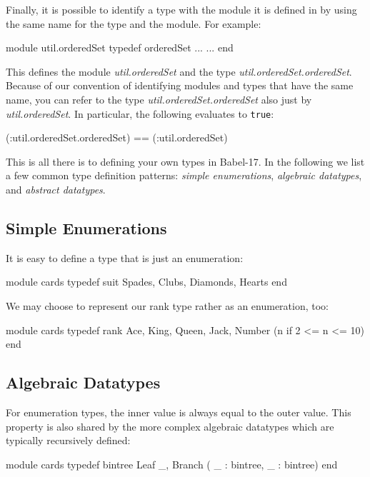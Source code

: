 \documentclass[11pt]{amsart}
\newcommand{\babelsrc}[1] {\lstinline!#1!}
\begin{document}
Finally, it is possible to identify a type with the module it is defined in by using the same name for the type and the module. For example:
\begin{babellisting}
module util.orderedSet
  typedef orderedSet ...
...
end
\end{babellisting}
This defines the module \emph{util.orderedSet} and the type \emph{util.orderedSet.orderedSet}. Because of our convention of identifying modules and types that have the same name, you can refer to the type \emph{util.orderedSet.orderedSet} also just by \emph{util.orderedSet}. In particular, the following evaluates to \babelsrc{true}:
\begin{babellisting}
(:util.orderedSet.orderedSet) == (:util.orderedSet)
\end{babellisting}

This is all there is to defining your own types in Babel-17. In the following we list a few common type definition patterns: \emph{simple enumerations}, \emph{algebraic datatypes}, and \emph{abstract datatypes}.

\subsection{Simple Enumerations}
It is easy to define a type that is just an enumeration:
\begin{babellisting}
module cards
  typedef suit Spades, Clubs, Diamonds, Hearts
end
\end{babellisting}
We may choose to represent our rank type rather as an enumeration, too:
\begin{babellisting}
module cards
  typedef rank Ace, King, Queen, Jack, Number (n if 2 <= n <= 10)
end
\end{babellisting}

\subsection{Algebraic Datatypes}
For enumeration types, the inner value is always equal to the outer value. This property is also shared by the more complex algebraic datatypes which are typically recursively defined: 
\begin{babellisting}
module cards
  typedef bintree Leaf _, Branch ( _ : bintree, _ : bintree)
end
\end{babellisting}
\end{document}
